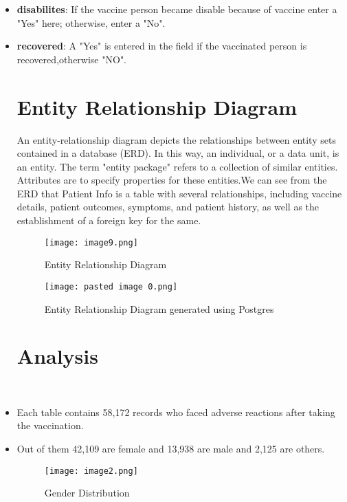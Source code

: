 \documentclass[conference]{IEEEtran}
\begin{document}
\begin{itemize}
\item \textbf{disabilites}: If the vaccine person became disable because of vaccine enter a "Yes" here; otherwise, enter a "No".\\


\item \textbf{recovered}: A "Yes" is entered in the field if the vaccinated person is recovered,otherwise "NO".\\

\section{Entity Relationship Diagram}
An entity-relationship diagram depicts the relationships between entity sets contained in a database (ERD). In this way, an individual, or a data unit, is an entity. The term "entity package" refers to a collection of similar entities. Attributes are to specify properties for these entities.We can see from the ERD that Patient Info is a table with several relationships, including vaccine details, patient outcomes, symptoms, and patient history, as well as the establishment of a foreign key for the same.

\begin{figure}[htp]
    \centering
    \texttt{[image: image9.png]}
    \caption{Entity Relationship Diagram}
    \label{fig:galaxy}
\end{figure}
 
\begin{figure}[htp]
    \centering
    \texttt{[image: pasted image 0.png]}
    \caption{Entity Relationship Diagram generated using Postgres}
    \label{fig:galaxy}
\end{figure}




\section{Analysis}\\

\item Each table contains 58,172 records who faced adverse reactions after taking the vaccination.\\
\item Out of them 42,109 are female and 13,938 are male and 2,125 are others.\\


\begin{figure}[htp]
    \centering
    \texttt{[image: image2.png]}
    \caption{Gender Distribution}
    \label{fig:galaxy}
\end{figure}\\


\end{itemize}
\end{document}

